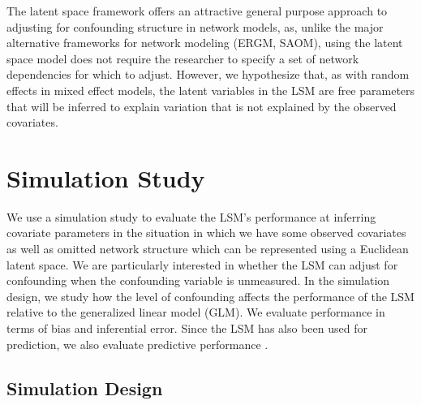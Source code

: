 \documentclass[11pt]{article}
\begin{document}
The latent space framework offers an attractive general purpose approach to adjusting for confounding structure in network models, as, unlike the major alternative frameworks for network modeling (ERGM, SAOM), using the latent space model does not require the researcher to specify a set of network dependencies for which to adjust.  However, we hypothesize that, as with random effects in mixed effect models, the latent variables in the LSM are free parameters that will be inferred to explain variation that is not explained by the observed covariates. 




\section{Simulation Study}

We use a simulation study to evaluate the LSM's performance at
inferring covariate parameters in the situation in which we have some
observed covariates as well as omitted network structure which can be
represented using a Euclidean latent space. We are particularly
interested in whether the LSM can adjust for confounding when the
confounding variable is unmeasured. In the simulation design, we study
how the level of confounding affects the performance of the LSM
relative to the generalized linear model (GLM). We evaluate performance in terms of bias and
inferential error. Since the LSM has also been used for prediction,  we also evaluate predictive performance
\citep[e.g., ]{ward2013gravity, fletcher2011social, fletcher2013network,
  chiu2011unifying}.

\subsection{Simulation Design}
\end{document}
